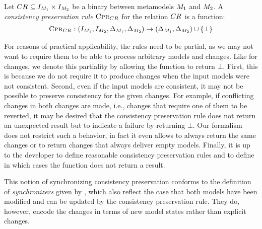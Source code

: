 \begin{definition}
    \label{def:consistencypreservationrule}
    Let $\consistencyrelation{CR}{} \subseteq \metamodelinstanceset{M}{1} \times \metamodelinstanceset{M}{2}$ be a binary \modellevelconsistencyrelation between metamodels $\metamodel{M}{1}$ and $\metamodel{M}{2}$.
    A \emph{consistency preservation rule} $\consistencypreservationrule{\consistencyrelation{CR}{}}$ for the relation $\consistencyrelation{CR}{}$ is a function:
    \begin{align*}
        \consistencypreservationrule{\consistencyrelation{CR}{}} : (\metamodelinstanceset{M}{1}, \metamodelinstanceset{M}{2}, \changeuniverse{\metamodel{M}{1}}, \changeuniverse{\metamodel{M}{2}}) \rightarrow (\changeuniverse{\metamodel{M}{1}}, \changeuniverse{\metamodel{M}{2}}) \cup \setted{\bot}
    \end{align*}
\end{definition}

For reasons of practical applicability, the rules need to be partial, as we may not want to require them to be able to process arbitrary models and changes.
Like for changes, we denote this partiality by allowing the function to return $\bot$.
First, this is because we do not require it to produce changes when the input models were not consistent.
Second, even if the input models are consistent, it may not be possible to preserve consistency for the given changes.
For example, if conflicting changes in both changes are made, i.e., changes that require one of them to be reverted, it may be desired that the consistency preservation rule does not return an unexpected result but to indicate a failure by returning $\bot$.
Our formalism does not restrict such a behavior, in fact it even allows to always return the same changes or to return changes that always deliver empty models.
Finally, it is up to the developer to define reasonable consistency preservation rules and to define in which cases the function does not return a result.

This notion of synchronizing consistency preservation conforms to the definition of \emph{synchronizers} given by \textcite{xiong2013SynchronizingConcurrentUpdates-SoSym}, which also reflect the case that both models have been modified and can be updated by the consistency preservation rule.
They do, however, encode the changes in terms of new model states rather than explicit changes.

